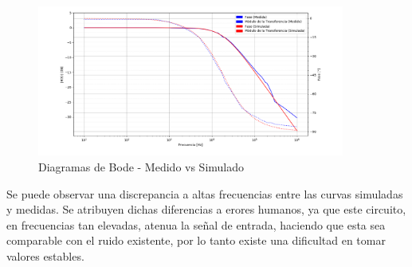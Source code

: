 \documentclass[11pt, a4paper]{article}
\begin{document}
\begin{figure}[H]
	\centering
	\includegraphics[width=0.9\textwidth]{Bode_filtro_pasabajo.png}
	\caption{Diagramas de Bode - Medido vs Simulado} 
	\label{graf:bodes_pasabajo}
\end{figure}
Se puede observar una discrepancia a altas frecuencias entre las curvas simuladas y medidas. Se atribuyen dichas diferencias a erores humanos, ya que este circuito, en frecuencias tan elevadas, atenua la señal de entrada, haciendo que esta sea comparable con el ruido existente, por lo tanto existe una dificultad en tomar valores estables.
\end{document}
